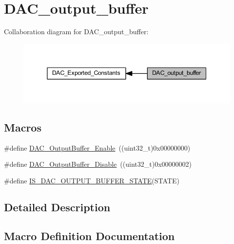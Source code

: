 \hypertarget{group___d_a_c__output__buffer}{}\section{D\+A\+C\+\_\+output\+\_\+buffer}
\label{group___d_a_c__output__buffer}
Collaboration diagram for D\+A\+C\+\_\+output\+\_\+buffer\+:
\nopagebreak
\begin{figure}[H]
\begin{center}
\leavevmode
\includegraphics[width=345pt]{group___d_a_c__output__buffer}
\end{center}
\end{figure}
\subsection*{Macros}
\begin{DoxyCompactItemize}
\item 
\#define \hyperlink{group___d_a_c__output__buffer_gab3f92803a8b6bc5fb3e4859908b5161f}{D\+A\+C\+\_\+\+Output\+Buffer\+\_\+\+Enable}~((uint32\+\_\+t)0x00000000)
\item 
\#define \hyperlink{group___d_a_c__output__buffer_gad41f919d7141398cfdedf8218ce64450}{D\+A\+C\+\_\+\+Output\+Buffer\+\_\+\+Disable}~((uint32\+\_\+t)0x00000002)
\item 
\#define \hyperlink{group___d_a_c__output__buffer_gaa5a56816d641129fb62d11133c9dcccd}{I\+S\+\_\+\+D\+A\+C\+\_\+\+O\+U\+T\+P\+U\+T\+\_\+\+B\+U\+F\+F\+E\+R\+\_\+\+S\+T\+A\+TE}(S\+T\+A\+TE)
\end{DoxyCompactItemize}


\subsection{Detailed Description}


\subsection{Macro Definition Documentation}
\mbox{\label{group___d_a_c__output__buffer_gad41f919d7141398cfdedf8218ce64450}} 
